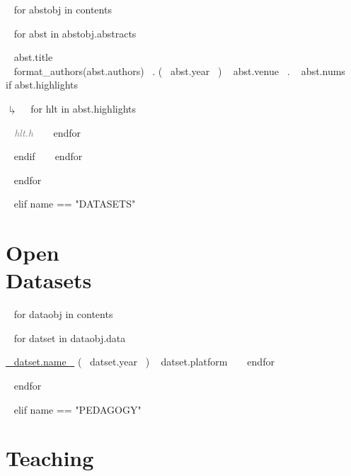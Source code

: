 ~{ for abstobj in contents }~ 
\begin{etaremune}[itemindent=-1.5\bibhang, topsep=0pt,
				   itemsep=\bibsep,partopsep=0pt,parsep=0pt,leftmargin={\bibhang+\widthof{[999]}}] 
    ~{ for abst in abstobj.abstracts  }~
    \item ~{{ abst.title }}~\\ ~{{ format_authors(abst.authors) }}~. (~{{ abst.year }}~) ~{{ abst.venue }}~. ~{{ abst.nums }}~
     ~{ if abst.highlights }~
     	\begin{list}{$\drsh$}{}
     	~{ for hlt in abst.highlights }~
	     \item  \textcolor{grey}{\textit{~{{ hlt.h }}~} }
     	~{ endfor }~
     	\end{list}
     ~{ endif }~
	~{ endfor }~


\end{etaremune}
~{ endfor }~



~{ elif name == "DATASETS" }~

\section{Open\\Datasets}

~{ for dataobj in contents }~ 
\begin{etaremune}[itemindent=-1.5\bibhang, topsep=0pt,
                   itemsep=\bibsep,partopsep=0pt,parsep=0pt,leftmargin={\bibhang+\widthof{[999]}}] 
    ~{ for datset in dataobj.data  }~
    \item \href{~{{ datset.link }}~}{~{{ datset.name }}~} (~{{ datset.year }}~) ~{{ datset.platform }}~
    ~{ endfor }~

\end{etaremune}
~{ endfor }~




~{ elif name == "PEDAGOGY" }~

\section{Teaching}


